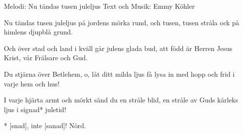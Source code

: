 \begin{song}


\begin{songmeta}
Melodi: Nu tändas tusen juleljus
Text och Musik: Emmy Köhler
\end{songmeta}

\begin{songtext}
Nu tändas tusen juleljus
på jordens mörka rund,
och tusen, tusen stråla ock
på himlens djupblå grund.

Och över stad och land i kväll
går julens glada bud,
att född är Herren Jesus Krist,
vår Frälsare och Gud.

Du stjärna över Betlehem,
o, låt ditt milda ljus
få lysa in med hopp och frid
i varje hem och hus!

I varje hjärta armt och mörkt
sänd du en stråle blid,
en stråle av Guds kärleks ljus
i signad* juletid!
\end{songtext}

\begin{songnotes}
* [s\sci{}\ng{}nad], inte [sa\sci{}nad]! Nörd.
\end{songnotes}

\end{song}
